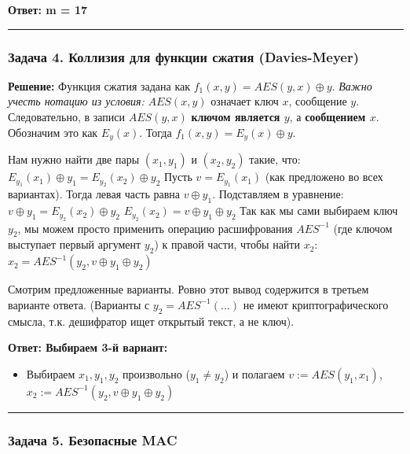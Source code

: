 ﻿\documentclass[9pt,a4paper]{extarticle}
\newcommand{\tightlist}{}
\begin{document}
\textbf{Ответ: m = 17}

\begin{center}\rule{0.5\linewidth}{0.5pt}\end{center}

\subsubsection{Задача 4. Коллизия для функции сжатия (Davies-Meyer)}\label{ux437ux430ux434ux430ux447ux430-4.-ux43aux43eux43bux43bux438ux437ux438ux44f-ux434ux43bux44f-ux444ux443ux43dux43aux446ux438ux438-ux441ux436ux430ux442ux438ux44f-davies-meyer}

\textbf{Решение:} Функция сжатия задана как \(f_1(x,y) = AES(y,x) \oplus y\). \emph{Важно учесть нотацию из условия:} \(AES(x,y)\) означает ключ \(x\), сообщение \(y\). Следовательно, в записи \(AES(y,x)\) \textbf{ключом является \(y\)}, а \textbf{сообщением \(x\)}. Обозначим это как \(E_y(x)\). Тогда \(f_1(x,y) = E_y(x) \oplus y\).

Нам нужно найти две пары \((x_1, y_1)\) и \((x_2, y_2)\) такие, что: \(E_{y_1}(x_1) \oplus y_1 = E_{y_2}(x_2) \oplus y_2\) Пусть \(v = E_{y_1}(x_1)\) (как предложено во всех вариантах). Тогда левая часть равна \(v \oplus y_1\). Подставляем в уравнение: \(v \oplus y_1 = E_{y_2}(x_2) \oplus y_2\) \(E_{y_2}(x_2) = v \oplus y_1 \oplus y_2\) Так как мы сами выбираем ключ \(y_2\), мы можем просто применить операцию расшифрования \(AES^{-1}\) (где ключом выступает первый аргумент \(y_2\)) к правой части, чтобы найти \(x_2\): \(x_2 = AES^{-1}(y_2, v \oplus y_1 \oplus y_2)\)

Смотрим предложенные варианты. Ровно этот вывод содержится в третьем варианте ответа. (Варианты с \(y_2 = AES^{-1}(...)\) не имеют криптографического смысла, т.к. дешифратор ищет открытый текст, а не ключ).

\textbf{Ответ: Выбираем 3-й вариант:}

\begin{itemize}
\tightlist
\item
  Выбираем \(x_1, y_1, y_2\) произвольно (\(y_1 \neq y_2\)) и полагаем \(v := AES(y_1, x_1)\), \(x_2 := AES^{-1}(y_2, v \oplus y_1 \oplus y_2)\)
\end{itemize}

\begin{center}\rule{0.5\linewidth}{0.5pt}\end{center}

\subsubsection{Задача 5. Безопасные MAC}\label{ux437ux430ux434ux430ux447ux430-5.-ux431ux435ux437ux43eux43fux430ux441ux43dux44bux435-mac}
\end{document}
